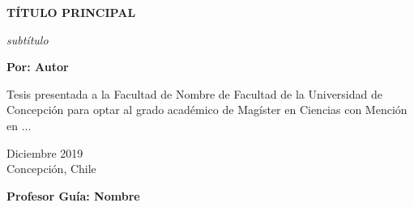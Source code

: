 
\begin{titlepage}
	
	
	\thispagestyle{frontpage}
	
	\begin{center}
		
		\vspace*{4\baselineskip}
	
		
		{\Huge \textbf{TÍTULO PRINCIPAL\\}}%
		        \vspace*{1.5\baselineskip}

		\large{\textit{subtítulo}}\\ %
		
        \vspace*{1,5\baselineskip}

		\large{\textbf{Por: Autor}}\\ %
		
		\vspace{1,5\baselineskip}
		
		\large{Tesis presentada a la Facultad de Nombre de Facultad de la Universidad de Concepción para optar al grado académico de Magíster en Ciencias con Mención en ...} %
		
		\vspace{1,5\baselineskip}
		Diciembre 2019\\ %
		Concepción, Chile %
\vspace{1,5\baselineskip}

		\large{\textbf{Profesor Guía: Nombre}}\\ %

	\end{center}
	
	\vspace*{4\baselineskip}
	
	
\end{titlepage}